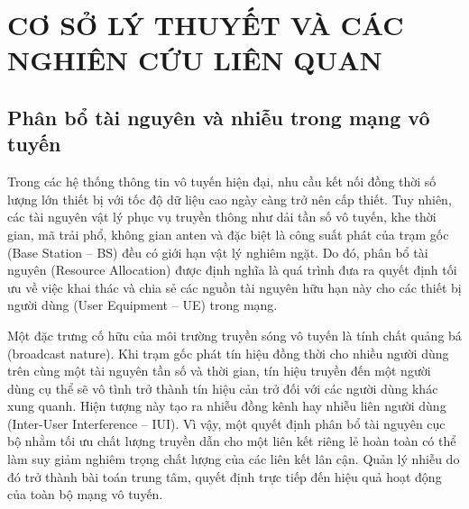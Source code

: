 \chapter{CƠ SỞ LÝ THUYẾT VÀ CÁC NGHIÊN CỨU LIÊN QUAN}
\label{chap:co-so-ly-thuyet}

\newcommand{\dexuat}[1]{\par\noindent\textit{$\blacktriangleright$ #1}\par\smallskip}

\section{Phân bổ tài nguyên và nhiễu trong mạng vô tuyến}
\label{sec:phan-bo-tai-nguyen}

Trong các hệ thống thông tin vô tuyến hiện đại, nhu cầu kết nối đồng thời số lượng lớn thiết bị với tốc
độ dữ liệu cao ngày càng trở nên cấp thiết. Tuy nhiên, các tài nguyên vật lý phục vụ truyền thông như
dải tần số vô tuyến, khe thời gian, mã trải phổ, không gian anten và đặc biệt là công suất phát của trạm
gốc (Base Station -- BS) đều có giới hạn vật lý nghiêm ngặt. Do đó, phân bổ tài nguyên (Resource
Allocation) được định nghĩa là quá trình đưa ra quyết định tối ưu về việc khai thác và chia sẻ các nguồn
tài nguyên hữu hạn này cho các thiết bị người dùng (User Equipment -- UE) trong mạng.

Một đặc trưng cố hữu của môi trường truyền sóng vô tuyến là tính chất quảng bá (broadcast nature). Khi
trạm gốc phát tín hiệu đồng thời cho nhiều người dùng trên cùng một tài nguyên tần số và thời gian, tín
hiệu truyền đến một người dùng cụ thể sẽ vô tình trở thành tín hiệu cản trở đối với các người dùng khác
xung quanh. Hiện tượng này tạo ra nhiễu đồng kênh hay nhiễu liên người dùng (Inter-User Interference --
IUI). Vì vậy, một quyết định phân bổ tài nguyên cục bộ nhằm tối ưu chất lượng truyền dẫn cho một liên kết
riêng lẻ hoàn toàn có thể làm suy giảm nghiêm trọng chất lượng của các liên kết lân cận. Quản lý nhiễu do
đó trở thành bài toán trung tâm, quyết định trực tiếp đến hiệu quả hoạt động của toàn bộ mạng vô tuyến.

